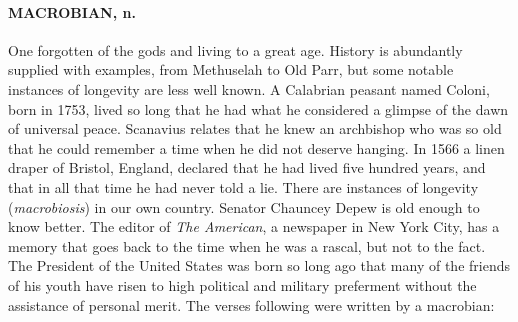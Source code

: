 \documentclass[11pt]{article}
\begin{document}
\paragraph{MACROBIAN, n.}  One forgotten of the gods and living to a great age.
History is abundantly supplied with examples, from Methuselah to Old
Parr, but some notable instances of longevity are less well known.  A
Calabrian peasant named Coloni, born in 1753, lived so long that he
had what he considered a glimpse of the dawn of universal peace.
Scanavius relates that he knew an archbishop who was so old that he
could remember a time when he did not deserve hanging.  In 1566 a
linen draper of Bristol, England, declared that he had lived five
hundred years, and that in all that time he had never told a lie.
There are instances of longevity ({\em macrobiosis}) in our own country.
Senator Chauncey Depew is old enough to know better.  The editor of
{\em The American}, a newspaper in New York City, has a memory that goes
back to the time when he was a rascal, but not to the fact.  The
President of the United States was born so long ago that many of the
friends of his youth have risen to high political and military
preferment without the assistance of personal merit.  The verses
following were written by a macrobian:
\end{document}
